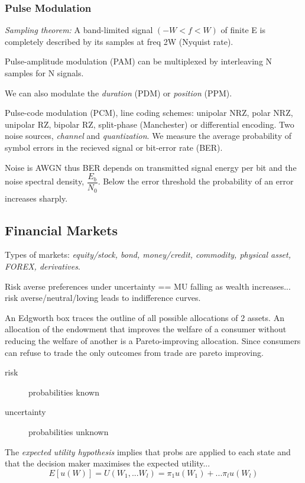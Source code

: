 \documentclass[a4paper,12pt]{article}
\begin{document}
\begin{multicols}{2}
\subsubsection*{Pulse Modulation}
\emph{Sampling theorem:} A band-limited signal $(-W < f < W)$ of finite E is
completely described by its samples at freq 2W (Nyquist rate).

Pulse-amplitude modulation (PAM) can be multiplexed by interleaving N samples
for N signals.

We can also modulate the \emph{duration} (PDM) or \emph{position} (PPM).

Pulse-code modulation (PCM), line coding schemes: unipolar NRZ, polar NRZ,
unipolar RZ, bipolar RZ, split-phase (Manchester) or differential encoding.
Two noise sources, \emph{channel} and \emph{quantization}. We measure the
average probability of symbol errors in the recieved signal or bit-error rate
(BER).

Noise is AWGN thus BER depends on transmitted signal energy per bit and the
noise spectral density, $\dfrac{E_b}{N_0}$. Below the error threshold the
probability of an error increases sharply.




\clearpage
\subsection*{Financial Markets}
Types of markets: \emph{equity/stock, bond, money/credit, commodity, physical
asset, FOREX, derivatives}.

Risk averse preferences under uncertainty == MU falling as wealth increases...
risk averse/neutral/loving leads to indifference curves.

An Edgworth box traces the outline of all possible allocations of 2 assets. An
allocation of the endowment that improves the welfare of a consumer without
reducing the welfare of another is a Pareto-improving allocation. Since
consumers can refuse to trade the only outcomes from trade are pareto
improving. 

\begin{description}
\item[risk] probabilities known
\item[uncertainty] probabilities unknown
\end{description}
The \emph{expected utility hypothesis} implies that probs are applied to each
state and that the decision maker maximises the expected utility...
\[E[u(W)]=U(W_1,...W_l)=\pi_1u(W_1)+...\pi_lu(W_l)\]

\end{multicols}
\end{document}
